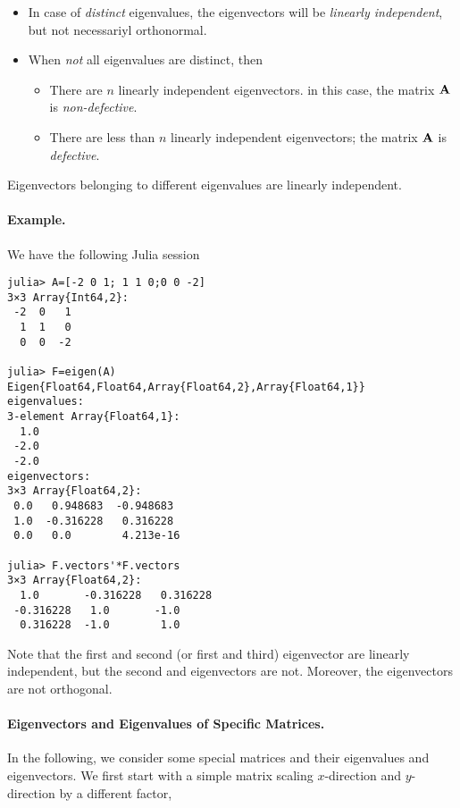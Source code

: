 \begin{itemize}

  \item In case of \emph{distinct} eigenvalues, the eigenvectors will be \emph{linearly independent}, but not necessariyl orthonormal.

  \item When \emph{not} all eigenvalues are distinct, then

    \begin{itemize}

    \item There are $n$ linearly independent eigenvectors. in this case, the matrix $\mathbf{A}$ is \emph{non-defective}.

    \item There are less than $n$ linearly independent eigenvectors; the matrix $\mathbf{A}$ is \emph{defective}. 

    \end{itemize}

\end{itemize}

Eigenvectors belonging to different eigenvalues are linearly independent. 

\paragraph{Example.} We have the following Julia session

\begin{verbatim}
julia> A=[-2 0 1; 1 1 0;0 0 -2]
3×3 Array{Int64,2}:
 -2  0   1
  1  1   0
  0  0  -2

julia> F=eigen(A)
Eigen{Float64,Float64,Array{Float64,2},Array{Float64,1}}
eigenvalues:
3-element Array{Float64,1}:
  1.0
 -2.0
 -2.0
eigenvectors:
3×3 Array{Float64,2}:
 0.0   0.948683  -0.948683 
 1.0  -0.316228   0.316228 
 0.0   0.0        4.213e-16

julia> F.vectors'*F.vectors
3×3 Array{Float64,2}:
  1.0       -0.316228   0.316228
 -0.316228   1.0       -1.0     
  0.316228  -1.0        1.0     

\end{verbatim}

Note that the first and second (or first and third) eigenvector are linearly independent, but the second and eigenvectors are not. Moreover, the eigenvectors are not orthogonal.

\paragraph{Eigenvectors and Eigenvalues of Specific Matrices.} In the following, we consider some special matrices and their eigenvalues and eigenvectors. We first start with a simple matrix scaling $x$-direction and $y$-direction by a different factor,

